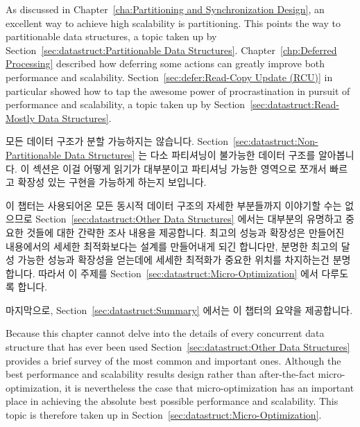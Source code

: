 As discussed in Chapter~\ref{cha:Partitioning and Synchronization Design},
an excellent way to achieve high scalability is partitioning.
This points the way to partitionable data structures, a topic taken up by
Section~\ref{sec:datastruct:Partitionable Data Structures}.
Chapter~\ref{chp:Deferred Processing} described how deferring some
actions can greatly improve both performance and scalability.
Section~\ref{sec:defer:Read-Copy Update (RCU)} in particular showed
how to tap the awesome power of procrastination in pursuit of
performance and scalability, a topic taken up by
Section~\ref{sec:datastruct:Read-Mostly Data Structures}.
\fi

모든 데이터 구조가 분할 가능하지는 않습니다.
Section~\ref{sec:datastruct:Non-Partitionable Data Structures} 는 다소
파티셔닝이 불가능한 데이터 구조를 알아봅니다.
이 섹션은 이걸 어떻게 읽기가 대부분이고 파티셔닝 가능한 영역으로 쪼개서 빠르고
확장성 있는 구현을 가능하게 하는지 보입니다.

이 챕터는 사용되어온 모든 동시적 데이터 구조의 자세한 부분들까지 이야기할 수는
없으므로
Section~\ref{sec:datastruct:Other Data Structures} 에서는 대부분의 유명하고
중요한 것들에 대한 간략한 조사 내용을 제공합니다.
최고의 성능과 확장성은 만들어진 내용에서의 세세한 최적화보다는 설계를
만들어내게 되긴 합니다만, 분명한 최고의 달성 가능한 성능과 확장성을 얻는데에
세세한 최적화가 중요한 위치를 차지하는건 분명합니다.
따라서 이 주제를
Section~\ref{sec:datastruct:Micro-Optimization} 에서 다루도록 합니다.

마지막으로, Section~\ref{sec:datastruct:Summary} 에서는 이 챕터의 요약을
제공합니다.
\iffalse

Because this chapter cannot delve into the details of every concurrent
data structure that has ever been used
Section~\ref{sec:datastruct:Other Data Structures}
provides a brief survey of the most common and important ones.
Although the best performance and scalability results design rather
than after-the-fact micro-optimization, it is nevertheless the case
that micro-optimization has an important place in achieving the
absolute best possible performance and scalability.
This topic is therefore taken up in
Section~\ref{sec:datastruct:Micro-Optimization}.

